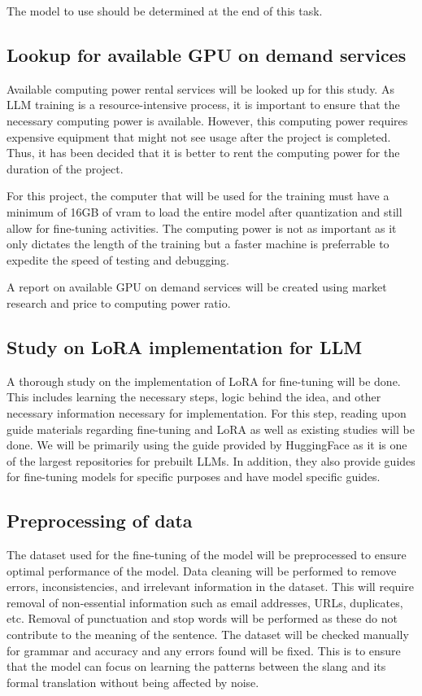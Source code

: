 The model to use should be determined at the end of this task.

\subsection{Lookup for available GPU on demand services} 
Available computing power rental services will be looked up for this study.
As LLM training is a resource-intensive process, it is important to ensure that the necessary computing power is available.
However, this computing power requires expensive equipment that might not see usage after the project is completed.
Thus, it has been decided that it is better to rent the computing power for the duration of the project.

For this project, the computer that will be used for the training must have a minimum of 16GB of vram to load the entire model after quantization and still allow for fine-tuning activities.
The computing power is not as important as it only dictates the length of the training but a faster machine is preferrable to expedite the speed of testing and debugging.

A report on available GPU on demand services will be created using market research and price to computing power ratio.

\subsection{Study on LoRA implementation for LLM}
A thorough study on the implementation of LoRA for fine-tuning will be done.
This includes learning the necessary steps, logic behind the idea, and other necessary information necessary for implementation.
For this step, reading upon guide materials regarding fine-tuning and LoRA as well as existing studies will be done.
We will be primarily using the guide provided by HuggingFace as it is one of the largest repositories for prebuilt LLMs.
In addition, they also provide guides for fine-tuning models for specific purposes and have model specific guides.

\subsection{Preprocessing of data} 
The dataset used for the fine-tuning of the model will be preprocessed to ensure optimal performance of the model.
Data cleaning will be performed to remove errors, inconsistencies, and irrelevant information in the dataset.
This will require removal of non-essential information such as email addresses, URLs, duplicates, etc.
Removal of punctuation and stop words will be performed as these do not contribute to the meaning of the sentence.
The dataset will be checked manually for grammar and accuracy and any errors found will be fixed. 
This is to ensure that the model can focus on learning the patterns between the slang and its formal translation without being affected by noise.

